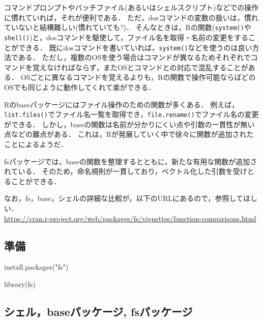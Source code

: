 \documentclass[
]{article}
\newenvironment{Shaded}{\begin{snugshade}}{\end{snugshade}}
\newcommand{\FunctionTok}[1]{\textcolor[rgb]{0.00,0.00,0.00}{#1}}
\newcommand{\NormalTok}[1]{#1}
\newcommand{\StringTok}[1]{\textcolor[rgb]{0.31,0.60,0.02}{#1}}
\begin{document}
コマンドプロンプトやバッチファイル(あるいはシェルスクリプト)などでの操作に慣れていれば，それが便利である．
ただ，dosコマンドの変数の扱いは，慣れていないと結構難しい(慣れていても?)．
そんなときは，Rの関数(\texttt{system()}や\texttt{shell()})と，dosコマンドを駆使して，ファイル名を取得・名前の変更をすることができる．
既にdosコマンドを書いていれば，\texttt{system()}などを使うのは良い方法である．
ただし，複数のOSを使う場合はコマンドが異なるためそれぞれでコマンドを覚えなければならず，またOSとコマンドとの対応で混乱することがある．
OSごとに異なるコマンドを覚えるよりも，Rの関数で操作可能ならばどのOSでも同じように動作してくれて楽ができる．

Rのbaseパッケージにはファイル操作のための関数が多くある．
例えば，\texttt{list.files()}でファイル名一覧を取得でき，\texttt{file.rename()}でファイル名の変更ができる．
しかし，baseの関数は名前が分かりにくい点や引数の一貫性が無い点などの難点がある．
これは，Rが発展していく中で徐々に関数が追加されたことによるようだ．

fsパッケージでは，baseの関数を整理するとともに，新たな有用な関数が追加されている．
そのため，命名規則が一貫しており，ベクトル化した引数を受けとることができる．

なお，fs，base，シェルの詳細な比較が，以下のURLにあるので，参照してほしい．\\
\url{https://cran.r-project.org/web/packages/fs/vignettes/function-comparisons.html}

\hypertarget{ux6e96ux5099-3}{%
\subsection{準備}\label{ux6e96ux5099-3}}

\begin{Shaded}
\begin{Highlighting}[]
\FunctionTok{install.packages}\NormalTok{(}\StringTok{"fs"}\NormalTok{)}
\end{Highlighting}
\end{Shaded}

\begin{Shaded}
\begin{Highlighting}[]
\FunctionTok{library}\NormalTok{(fs)}
\end{Highlighting}
\end{Shaded}

\hypertarget{ux30b7ux30a7ux30ebbaseux30d1ux30c3ux30b1ux30fcux30b8-fsux30d1ux30c3ux30b1ux30fcux30b8}{%
\subsection{シェル，baseパッケージ, fsパッケージ}\label{ux30b7ux30a7ux30ebbaseux30d1ux30c3ux30b1ux30fcux30b8-fsux30d1ux30c3ux30b1ux30fcux30b8}}
\end{document}
